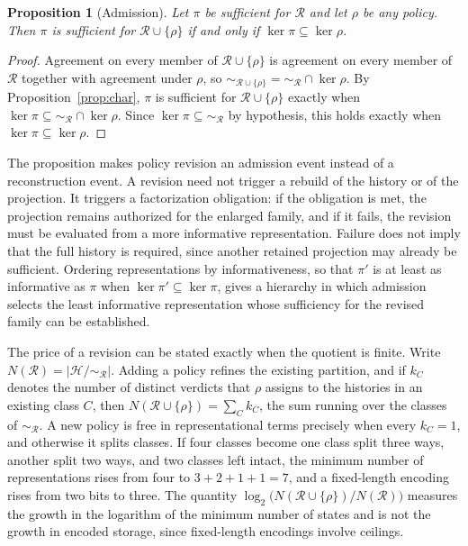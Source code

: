 \documentclass[11pt]{article}
\newtheorem{proposition}{Proposition}
\theoremstyle{remark}
\newcommand{\Hist}{\mathcal{H}}
\newcommand{\Rev}{\mathcal{R}}
\renewcommand{\ker}{\operatorname{ker}}
\begin{document}
\begin{proposition}[Admission]\label{prop:admit}
Let $\pi$ be sufficient for $\Rev$ and let $\rho$ be any policy. Then $\pi$ is sufficient for $\Rev\cup\{\rho\}$ if and only if $\ker\pi\subseteq\ker\rho$.
\end{proposition}

\begin{proof}
Agreement on every member of $\Rev\cup\{\rho\}$ is agreement on every member of $\Rev$ together with agreement under $\rho$, so ${\sim_{\Rev\cup\{\rho\}}}={\sim_{\Rev}}\cap\ker\rho$. By Proposition~\ref{prop:char}, $\pi$ is sufficient for $\Rev\cup\{\rho\}$ exactly when $\ker\pi\subseteq{\sim_{\Rev}}\cap\ker\rho$. Since $\ker\pi\subseteq{\sim_{\Rev}}$ by hypothesis, this holds exactly when $\ker\pi\subseteq\ker\rho$.
\end{proof}

The proposition makes policy revision an admission event instead of a reconstruction event. A revision need not trigger a rebuild of the history or of the projection. It triggers a factorization obligation: if the obligation is met, the projection remains authorized for the enlarged family, and if it fails, the revision must be evaluated from a more informative representation. Failure does not imply that the full history is required, since another retained projection may already be sufficient. Ordering representations by informativeness, so that $\pi'$ is at least as informative as $\pi$ when $\ker\pi'\subseteq\ker\pi$, gives a hierarchy in which admission selects the least informative representation whose sufficiency for the revised family can be established.

The price of a revision can be stated exactly when the quotient is finite. Write $N(\Rev)=|\Hist/{\sim_{\Rev}}|$. Adding a policy refines the existing partition, and if $k_C$ denotes the number of distinct verdicts that $\rho$ assigns to the histories in an existing class $C$, then $N(\Rev\cup\{\rho\})=\sum_{C}k_C$, the sum running over the classes of $\sim_{\Rev}$. A new policy is free in representational terms precisely when every $k_C=1$, and otherwise it splits classes. If four classes become one class split three ways, another split two ways, and two classes left intact, the minimum number of representations rises from four to $3+2+1+1=7$, and a fixed-length encoding rises from two bits to three. The quantity $\log_2\bigl(N(\Rev\cup\{\rho\})/N(\Rev)\bigr)$ measures the growth in the logarithm of the minimum number of states and is not the growth in encoded storage, since fixed-length encodings involve ceilings.
\end{document}
